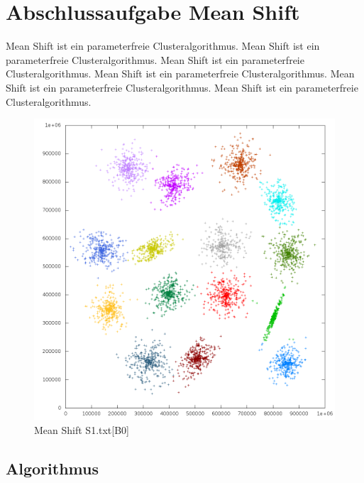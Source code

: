 \chapter{Abschlussaufgabe Mean Shift}
Mean Shift ist ein parameterfreie Clusteralgorithmus. 
Mean Shift ist ein parameterfreie Clusteralgorithmus. 
Mean Shift ist ein parameterfreie Clusteralgorithmus. 
Mean Shift ist ein parameterfreie Clusteralgorithmus. 
Mean Shift ist ein parameterfreie Clusteralgorithmus. 
Mean Shift ist ein parameterfreie Clusteralgorithmus.\\
\vspace{11pt}
\begin{figure}[h]
	\centering
	\includegraphics[scale=0.6]{../meanshift/output/pics/s1_colored.png} 
	\caption{Mean Shift S1.txt[B0]}
\end{figure}

\section{Algorithmus}
